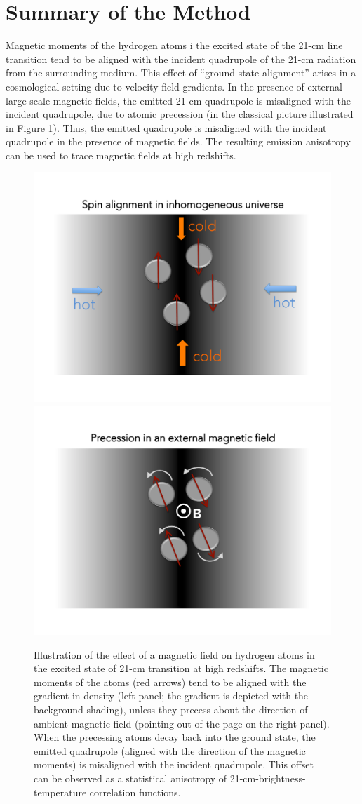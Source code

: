 \section{Summary of the Method}
\label{sec:method}

Magnetic moments of the hydrogen atoms i the excited state of the 21-cm line transition tend to be aligned with the incident quadrupole of the 21-cm radiation from the surrounding medium. This effect of ``ground-state alignment'' \cite{Yan08,Yan12} arises in a cosmological setting due to velocity-field gradients. In the presence of external large-scale magnetic fields, the emitted 21-cm quadrupole is misaligned with the incident quadrupole, due to atomic precession (in the classical picture illustrated in Figure \ref{fig:precession}). Thus, the emitted quadrupole is misaligned with the incident quadrupole in the presence of magnetic fields. The resulting emission anisotropy can be used to trace magnetic fields at high redshifts.
\begin{figure}
\centering
\includegraphics[width=.35\textwidth,keepaspectratio=true]{Slide2.pdf}
\includegraphics[width=.35\textwidth,keepaspectratio=true]{Slide3.pdf}
\caption{Illustration of the effect of a magnetic field on hydrogen atoms in the excited state of 21-cm transition at high redshifts. The magnetic moments of the atoms (red arrows) tend to be aligned with the gradient in density (left panel; the gradient is depicted with the background shading), unless they precess about the direction of ambient magnetic field (pointing out of the page on the right panel). When the precessing atoms decay back into the ground state, the emitted quadrupole (aligned with the direction of the magnetic moments) is misaligned with the incident quadrupole. This offset can be observed as a statistical anisotropy of 21-cm-brightness-temperature correlation functions.\label{fig:precession}}
\end{figure}

